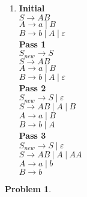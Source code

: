 \documentclass[11pt]{article}
\newcommand{\pipe}{\hspace{3pt}|\hspace{3pt}}
\theoremstyle{definition}
\theoremstyle{case}
\theoremstyle{theorem}
\newtheorem{prob}{Problem}
\begin{document}
\begin{enumerate}[label=(\alph*)]
\item
\textbf{Initial} \\
$S \rightarrow AB$ \\
$A \rightarrow a \pipe B$\\
$B \rightarrow b \pipe A \pipe \varepsilon$ \\
\textbf{Pass 1} \\
$S_{new} \rightarrow S$ \\
$S \rightarrow AB$ \\
$A \rightarrow a \pipe B$\\
$B \rightarrow b \pipe A \pipe \varepsilon$ \\
\textbf{Pass 2} \\
$S_{new} \rightarrow S \pipe \varepsilon$ \\
$S \rightarrow AB \pipe A \pipe B$ \\
$A \rightarrow a \pipe B$\\
$B \rightarrow b \pipe A$\\
\textbf{Pass 3} \\
$S_{new} \rightarrow S \pipe \varepsilon$ \\
$S \rightarrow AB \pipe A \pipe AA$ \\
$A \rightarrow a \pipe b$\\
$B \rightarrow b$\\

\end{enumerate}

\begin{prob}\end{prob}
\end{document}
